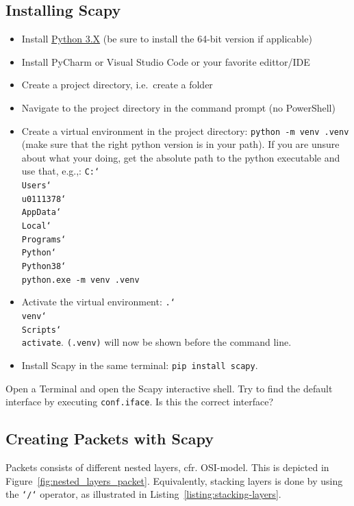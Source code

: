 \documentclass[11pt,a4paper]{article}
\begin{document}
\subsection{Installing Scapy}
\begin{itemize}
    \item Install \href{https://www.python.org/downloads}{Python 3.X} (be sure to install the 64-bit version if applicable)
    \item Install PyCharm or Visual Studio Code or your favorite edittor/IDE
    \item Create a project directory, i.e.\ create a folder
    \item Navigate to the project directory in the command prompt (no PowerShell)
    \item Create a virtual environment in the project directory: \texttt{python -m venv .venv} (make sure that the right python version is in your path). If you are unsure about what your doing, get the absolute path to the python executable and use that, e.g.,:
    \texttt{C:\char`\\Users\char`\\u0111378\char`\\AppData\char`\\Local\char`\\Programs\char`\\Python\char`\\Python38\char`\\python.exe -m venv .venv}
    \item Activate the virtual environment:
    \texttt{.\char`\\venv\char`\\Scripts\char`\\activate}. \texttt{(.venv)} will now be shown before the command line.
    \item Install Scapy in the same terminal: \texttt{pip install scapy}.
\end{itemize}

\begin{question}
    Open a Terminal and open the Scapy interactive shell. Try to find the default interface by executing \texttt{conf.iface}. Is this the correct interface? 
\end{question}

\subsection{Creating Packets with Scapy}
Packets consists of different nested layers, cfr. OSI-model. This is depicted in Figure~\ref{fig:nested_layers_packet}. Equivalently, stacking layers is done by using the \texttt{`/`} operator, as illustrated in Listing~\ref{listing:stacking-layers}.
\end{document}
